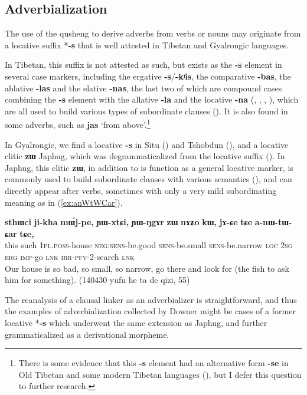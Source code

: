 \documentclass[oneside,a4paper,11pt]{article}
\newcommand{\ipa}[1]{{\phon\textbf{\mbox{#1}}}}
\begin{document}
\subsection{Adverbialization}
The use of the qusheng  to derive adverbs from verbs or nouns may originate from a locative suffix *\ipa{-s} that is well attested in Tibetan and Gyalrongic languages.

In Tibetan, this suffix is not attested as such, but exists as the \ipa{-s} element in several case markers, including the ergative \ipa{-s}/\ipa{-kʲis}, the comparative \ipa{-bas}, the ablative \ipa{-las} and the elative \ipa{-nas}, the last two of which are compound cases combining the \ipa{-s} element with the allative \ipa{-la} and the locative \ipa{-na} (\citet{konow09intro},  \citealt{delancey82ergative}, \citealt[282]{zeisler11kenhat}, \citealt{hill12bas}), which are all used to build various types of subordinate clauses (\citealt{tournadre10cases}). It is also found in some adverbs, such as \ipa{jas} `from above'.\footnote{There is some evidence that this \ipa{-s} element had an alternative form \ipa{-se} in Old Tibetan and some modern Tibetan languages (\citealt[280-284]{zeisler11kenhat}), but I defer this question to further research.}

In Gyalrongic, we find a locative \ipa{-s} in Situ (\citealt{linxr93jiarong}) and Tshobdun (\citealt[129]{jackson98morphology}), and a locative clitic \ipa{zɯ} Japhug, which was degrammaticalized from the locative suffix (\citealt[167-9]{jacques08}). In Japhug, this clitic \ipa{zɯ}, in addition to is function as a general locative marker, is commonly used to build subordinate clauses with various semantics (\citealt[275;293]{jacques14linking}), and can directly appear after verbs, sometimes with only a very mild subordinating meaning as in (\ref{ex:anWtWCar}).

\begin{exe}
\ex \label{ex:anWtWCar}
\gll \ipa{kɯki} 	\ipa{sthɯci} 	\ipa{ji-kha} 	\ipa{mɯ́j-pe,} 	\ipa{ɲɯ-xtɕi,} 	\ipa{ɲɯ-ŋgɤr} 	\ipa{zɯ} 	\ipa{nɤʑo} 	\ipa{kɯ,}  \ipa{jɤ-ɕe} 	\ipa{tɕe} 	\ipa{a-nɯ-tɯ-ɕar} 	\ipa{tɕe,}  \\
this such \textsc{1pl.poss}-house \textsc{neg:sens}-be.good  \textsc{sens}-be.small  \textsc{sens}-be.narrow \textsc{loc} \textsc{2sg} \textsc{erg} \textsc{imp}-go \textsc{lnk}  \textsc{irr-pfv}-2-search \textsc{lnk} \\
\glt Our house is so bad, so small, so narrow, go there and look for (the fish to ask him for something). (140430 yufu he ta de qizi, 55)
\end{exe}
The reanalysis of a clausal linker as an adverbializer is straightforward, and thus the examples of adverbialization collected by Downer might be cases of a former locative *\ipa{-s} which underwent the same extension as Japhug, and further grammaticalized as a derivational morpheme.
 
\end{document}
